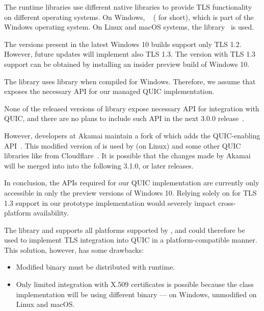 The \dotnet{} runtime libraries use different native libraries to provide TLS functionality on
different operating systems. On Windows, ~\cite{Schannel} (\libschannel{}
for short), which is part of the Windows operating system. On Linux and macOS systems, the
\libopenssl{} library~\cite{OpenSSLWeb} is used.

\begin{description}

    The \libschannel{} versions present in the latest Windows 10
    builds support only TLS 1.2.  However, future updates will implement also TLS 1.3. The
    \libschannel{} version with TLS 1.3 support can be obtained by installing an insider preview
    build of Windows 10.

    The \libmsquic{} library uses \libschannel{} library when compiled for Windows. Therefore, we
    assume that \libschannel{} exposes the necessary API for our managed QUIC implementation.

    \ditem{\libopenssl{}}
    None of the released versions of \libopenssl{} library expose necessary API for integration
    with QUIC, and there are no plans to include such API in the next \libopenssl{} 3.0.0
    release~\cite{OpensslBlogNoQuic}.

    However, developers at Akamai maintain a fork of \libopenssl{} which adds the QUIC-enabling
    API~\cite{AkamaiOpensslGithub}. This modified version of \libopenssl{} is used by \libmsquic{}
    (on Linux) and some other QUIC libraries like  from
    Cloudflare~\cite{quicheGithub}. It is possible that the changes made by Akamai will be merged
    into \libopenssl{} into the following 3.1.0, or later releases.

\end{description}

In conclusion, the APIs required for our QUIC implementation are currently only accessible in only
the preview versions of Windows 10. Relying solely on \libschannel{} for TLS 1.3 support in our
prototype implementation would severely impact cross-platform availability.

The \libopenssl{} library and supports all platforms supported by \dotnet{}, and could therefore be
used to implement TLS integration into QUIC in a platform-compatible manner. This solution, however,
has some drawbacks:

\begin{itemize}

  \item Modified \libopenssl{} binary must be distributed with \dotnet{} runtime.

  \item Only limited integration with X.509 certificates is possible because the
     class implementation will be using different binary ---
     on Windows, unmodified \libopenssl{} on Linux and macOS.

\end{itemize}

